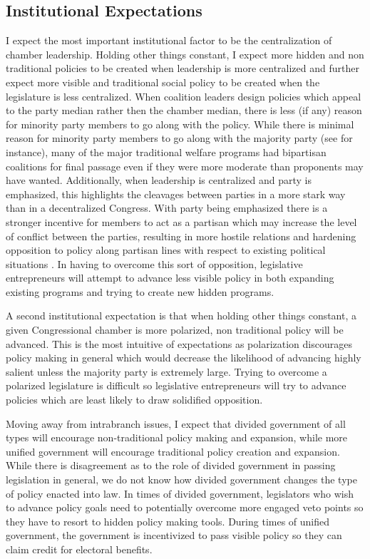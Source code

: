 \documentclass[12pt]{article}
\begin{document}
\subsection{Institutional Expectations}
I expect the most important institutional factor to be the centralization of chamber leadership. Holding other things constant, I expect more hidden and non traditional policies to be created when leadership is more centralized and further expect more visible and traditional social policy to be created when the legislature is less centralized. When coalition leaders design policies which appeal to the party median rather then the chamber median, there is less (if any) reason for minority party members to go along with the policy. While there is minimal reason for minority party members to go along with the majority party (see \citet{cox2004} for instance), many of the major traditional welfare programs had bipartisan coalitions for final passage even if they were more moderate than proponents may have wanted. Additionally, when leadership is centralized and party is emphasized, this highlights the cleavages between parties in a more stark way than in a decentralized Congress. With party being emphasized there is a stronger incentive for members to act as a partisan which may increase the level of conflict between the parties, resulting in more hostile relations and hardening opposition to policy along partisan lines with respect to existing political situations \citep{lee2009}. In having to overcome this sort of opposition, legislative entrepreneurs will attempt to advance less visible policy in both expanding existing programs and trying to create new hidden programs. 

A second institutional expectation is that when holding other things constant, a given Congressional chamber is more polarized, non traditional policy will be advanced. This is the most intuitive of expectations as polarization discourages policy making in general which would decrease the likelihood of advancing highly salient unless the majority party is extremely large. Trying to overcome a polarized legislature is difficult so legislative entrepreneurs will try to advance policies which are least likely to draw solidified opposition.

Moving away from intrabranch issues, I expect that divided government of all types will encourage non-traditional policy making and expansion, while more unified government will encourage traditional policy creation and expansion. While there is disagreement as to the role of divided government in passing legislation in general, we do not know how divided government changes the type of policy enacted into law. In times of divided government, legislators who wish to advance policy goals need to potentially overcome more engaged veto points so they have to resort to hidden policy making tools. During times of unified government, the government is incentivized to pass visible policy so they can claim credit for electoral benefits.
\end{document}
